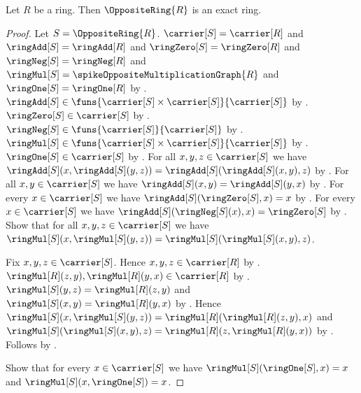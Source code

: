 \begin{theorem}\label{spike_opposite_ring_is_exact}
    Let $R$ be a ring.
    Then $\OppositeRing{R}$ is an exact ring.
\end{theorem}
\begin{proof}
    Let $S=\OppositeRing{R}$.
    $\carrier[S]=\carrier[R]$ and
        $\ringAdd[S]=\ringAdd[R]$ and
        $\ringZero[S]=\ringZero[R]$ and
        $\ringNeg[S]=\ringNeg[R]$ and
        $\ringMul[S]=\spikeOppositeMultiplicationGraph{R}$ and
        $\ringOne[S]=\ringOne[R]$ by
        .
    $\ringAdd[S]\in
        \funs{\carrier[S]\times\carrier[S]}{\carrier[S]}$ by
        .
    $\ringZero[S]\in\carrier[S]$ by .
    $\ringNeg[S]\in\funs{\carrier[S]}{\carrier[S]}$ by
        .
    $\ringMul[S]\in
        \funs{\carrier[S]\times\carrier[S]}{\carrier[S]}$ by
        .
    $\ringOne[S]\in\carrier[S]$ by .
    For all $x,y,z\in\carrier[S]$ we have
        $\ringAdd[S](x,\ringAdd[S](y,z))
            =\ringAdd[S](\ringAdd[S](x,y),z)$ by
        .
    For all $x,y\in\carrier[S]$ we have
        $\ringAdd[S](x,y)=\ringAdd[S](y,x)$ by
        .
    For every $x\in\carrier[S]$ we have
        $\ringAdd[S](\ringZero[S],x)=x$ by
        .
    For every $x\in\carrier[S]$ we have
        $\ringAdd[S](\ringNeg[S](x),x)=\ringZero[S]$ by
        .
    Show that for all $x,y,z\in\carrier[S]$ we have
        $\ringMul[S](x,\ringMul[S](y,z))
            =\ringMul[S](\ringMul[S](x,y),z)$.
    \begin{subproof}
        Fix $x,y,z\in\carrier[S]$.
        Hence $x,y,z\in\carrier[R]$ by \auto.
        $\ringMul[R](z,y),\ringMul[R](y,x)\in\carrier[R]$ by
            .
        $\ringMul[S](y,z)=\ringMul[R](z,y)$ and
            $\ringMul[S](x,y)=\ringMul[R](y,x)$ by
            .
        Hence
            $\ringMul[S](x,\ringMul[S](y,z))
                =\ringMul[R](\ringMul[R](z,y),x)$ and
            $\ringMul[S](\ringMul[S](x,y),z)
                =\ringMul[R](z,\ringMul[R](y,x))$ by
            .
        Follows by .
    \end{subproof}
    Show that for every $x\in\carrier[S]$ we have
        $\ringMul[S](\ringOne[S],x)=x$ and
        $\ringMul[S](x,\ringOne[S])=x$.

\end{proof}
